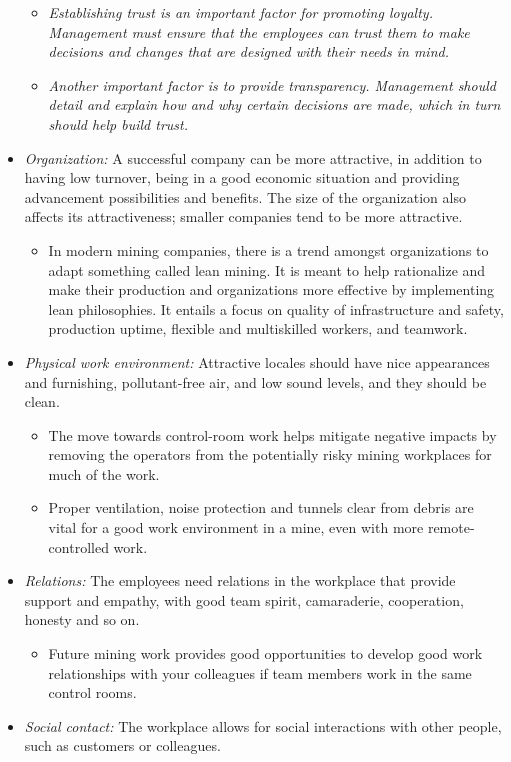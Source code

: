 \documentclass[
  12pt,
]{scrbook}
\providecommand{\tightlist}{%
  \setlength{\itemsep}{0pt}\setlength{\parskip}{0pt}}
\begin{document}
\begin{itemize}
  \begin{itemize}
  \item
    \emph{Establishing trust is an important factor for promoting loyalty. Management must ensure that the employees can trust them to make decisions and changes that are designed with their needs in mind.}
  \item
    \emph{Another important factor is to provide transparency. Management should detail and explain how and why certain decisions are made, which in turn should help build trust.}
  \end{itemize}
\item
  \emph{Organization:} A successful company can be more attractive, in addition to having low turnover, being in a good economic situation and providing advancement possibilities and benefits. The size of the organization also affects its attractiveness; smaller companies tend to be more attractive.

  \begin{itemize}
  \tightlist
  \item
    In modern mining companies, there is a trend amongst organizations to adapt something called lean mining. It is meant to help rationalize and make their production and organizations more effective by implementing lean philosophies. It entails a focus on quality of infrastructure and safety, production uptime, flexible and multiskilled workers, and teamwork.
  \end{itemize}
\item
  \emph{Physical work environment:} Attractive locales should have nice appearances and furnishing, pollutant-free air, and low sound levels, and they should be clean.

  \begin{itemize}
  \item
    The move towards control-room work helps mitigate negative impacts by removing the operators from the potentially risky mining workplaces for much of the work.
  \item
    Proper ventilation, noise protection and tunnels clear from debris are vital for a good work environment in a mine, even with more remote-controlled work.
  \end{itemize}
\item
  \emph{Relations:} The employees need relations in the workplace that provide support and empathy, with good team spirit, camaraderie, cooperation, honesty and so on.

  \begin{itemize}
  \tightlist
  \item
    Future mining work provides good opportunities to develop good work relationships with your colleagues if team members work in the same control rooms.
  \end{itemize}
\item
  \emph{Social contact:} The workplace allows for social interactions with other people, such as customers or colleagues.


\end{itemize}
\end{document}
